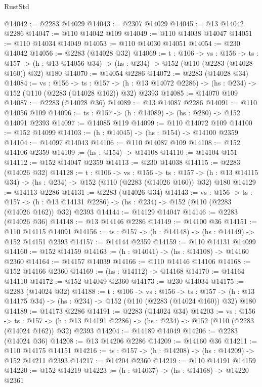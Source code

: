 \begin{lexlean}{RustStd}
\begin{coremodule}
@14042 := @2283 @14029
@14043 := @2307 @14029
@14045 := @13 @14042 @2286
@14047 := @110 @14042 @109
@14049 := @110 @14038 @14047
@14051 := @110 @14034 @14049
@14053 := @110 @14030 @14051
@14054 := @230 @14042
@14056 := @2283 (@14028 @32)
@14069 := {t : @106} ->
  {vs : @156} ->
  {ts : @157} -> (h : @13 @14056 @34) -> (hs : @234) -> @152 (@110 (@2283 (@14028 @160)) @32) @180
@14070 := @14054 @2286
@14072 := @2283 (@14028 @34)
@14084 := {vs : @156} ->
  {ts : @157} ->
  (h : @13 @14072 @2286) -> (hs : @234) -> @152 (@110 (@2283 (@14028 @162)) @32) @2393
@14085 := @14070 @109
@14087 := @2283 (@14028 @36)
@14089 := @13 @14087 @2286
@14091 := @110 @14056 @109
@14096 := {ts : @157} -> (h : @14089) -> (hs : @280) -> @152 @14091 @2393
@14097 := @14085 @119
@14099 := @110 @14072 @109
@14100 := @152 @14099
@14103 := (h : @14045) -> (hs : @154) -> @14100 @2359
@14104 := @14097 @14043
@14106 := @110 @14087 @109
@14108 := @152 @14106 @2359
@14109 := (hs : @154) -> @14108
@14110 := @14104 @151
@14112 := @152 @14047 @2359
@14113 := @230 @14038
@14115 := @2283 (@14026 @32)
@14128 := {t : @106} ->
  {vs : @156} ->
  {ts : @157} -> (h : @13 @14115 @34) -> (hs : @234) -> @152 (@110 (@2283 (@14026 @160)) @32) @180
@14129 := @14113 @2286
@14131 := @2283 (@14026 @34)
@14143 := {vs : @156} ->
  {ts : @157} ->
  (h : @13 @14131 @2286) -> (hs : @234) -> @152 (@110 (@2283 (@14026 @162)) @32) @2393
@14144 := @14129 @14047
@14146 := @2283 (@14026 @36)
@14148 := @13 @14146 @2286
@14149 := @14100 @36
@14151 := @110 @14115 @14091
@14156 := {ts : @157} -> (h : @14148) -> (hs : @14149) -> @152 @14151 @2393
@14157 := @14144 @2359
@14159 := @110 @14131 @14099
@14160 := @152 @14159
@14163 := (h : @14041) -> (hs : @14108) -> @14160 @2360
@14164 := @14157 @14039
@14166 := @110 @14146 @14106
@14168 := @152 @14166 @2360
@14169 := (hs : @14112) -> @14168
@14170 := @14164 @14110
@14172 := @152 @14049 @2360
@14173 := @230 @14034
@14175 := @2283 (@14024 @32)
@14188 := {t : @106} ->
  {vs : @156} ->
  {ts : @157} -> (h : @13 @14175 @34) -> (hs : @234) -> @152 (@110 (@2283 (@14024 @160)) @32) @180
@14189 := @14173 @2286
@14191 := @2283 (@14024 @34)
@14203 := {vs : @156} ->
  {ts : @157} ->
  (h : @13 @14191 @2286) -> (hs : @234) -> @152 (@110 (@2283 (@14024 @162)) @32) @2393
@14204 := @14189 @14049
@14206 := @2283 (@14024 @36)
@14208 := @13 @14206 @2286
@14209 := @14160 @36
@14211 := @110 @14175 @14151
@14216 := {ts : @157} -> (h : @14208) -> (hs : @14209) -> @152 @14211 @2393
@14217 := @14204 @2360
@14219 := @110 @14191 @14159
@14220 := @152 @14219
@14223 := (h : @14037) -> (hs : @14168) -> @14220 @2361

\end{coremodule}
\end{lexlean}
